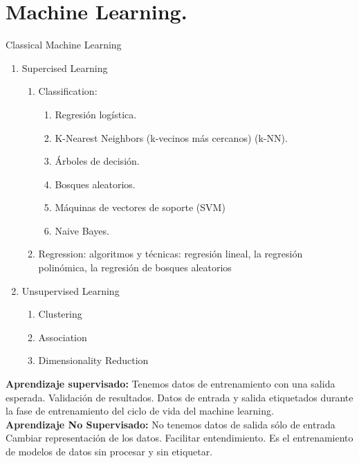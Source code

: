 \documentclass[../main.tex]{subfiles}
\begin{document}
\section{Machine Learning.}
    Classical Machine Learning
    \begin{enumerate}
        \item Supercised Learning
        \begin{enumerate}
            \item Classification:
                \begin{enumerate}
                    \item Regresión logística.
                    \item K-Nearest Neighbors (k-vecinos más cercanos) (k-NN).
                    \item Árboles de decisión.
                    \item Bosques aleatorios.
                    \item Máquinas de vectores de soporte (SVM)
                    \item Naive Bayes.
                \end{enumerate}
            \item Regression: algoritmos y técnicas: regresión lineal, la regresión polinómica, la regresión de bosques aleatorios
        \end{enumerate}
        \item Unsupervised Learning
        \begin{enumerate}
            \item Clustering
            \item Association
            \item Dimensionality Reduction
        \end{enumerate}
    \end{enumerate}
	
    \textbf{Aprendizaje supervisado:} Tenemos datos de entrenamiento con una salida esperada. Validación de resultados. Datos de entrada y salida etiquetados durante la fase de entrenamiento del ciclo de vida del machine learning.\\
    
    \textbf{Aprendizaje No Supervisado:} No tenemos datos de salida sólo de entrada
    Cambiar representación de los datos. Facilitar entendimiento. Es el entrenamiento de modelos de datos sin procesar y sin etiquetar.\\
	
	
\end{document}

